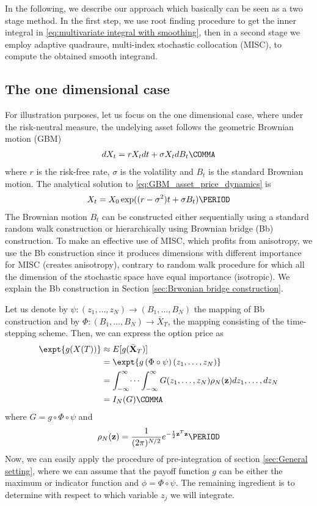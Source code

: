 In the following, we describe our approach which basically can be seen as a two stage method. In the first step, we use root finding procedure to get the inner integral  in \eqref{eq:multivariate integral with smoothing}, then in a second stage we employ adaptive quadraure, multi-index stochastic collocation (MISC), to compute the obtained smooth integrand.

\subsection{The one dimensional case}
For illustration purposes, let us focus on the one dimensional case, where under the risk-neutral measure, the undelying asset follows the geometric Brownian motion (GBM)
\begin{align}\label{eq:GBM_asset_price_dynamics}
dX_t= r X_t dt+\sigma X_t dB_t \COMMA 
\end{align}
		where $r$ is the risk-free rate, $\sigma$ is the volatility and $B_t$ is the standard Brownian motion. The analytical solution to  \eqref{eq:GBM_asset_price_dynamics} is 
\begin{align*}
	X_t=  X_0 \exp(( r-\sigma^2) t+\sigma B_t) \PERIOD
\end{align*}
The Brownian motion $B_t$ can be constructed either sequentially using a standard random walk construction or hierarchically using Brownian bridge (Bb) construction. To make an effective use of MISC, which profits from  anisotropy, we use the Bb construction since it produces  dimensions with different importance for MISC (creates anisotropy), contrary to random walk procedure for which all the dimension of the stochastic space have equal importance (isotropic). We explain the Bb construction in Section \ref{sec:Brwonian bridge construction}.

Let us denote by $\psi: (z_1,\dots,z_N) \rightarrow (B_1,\dots,B_N)$ the mapping of Bb construction and by $\Phi: (B_1,\dots,B_N) \rightarrow \bar{X}_T$, the mapping consisting of the time-stepping scheme. Then, we can express the option price as
\begin{align}\label{eq: option price as integral}
\expt{g(X(T))}&\approx E[g(\bar{\mathbf{X}}_T)] \nonumber\\
&=\expt{g\left(\Phi \circ \psi \right) (z_1,\dots,z_N)} \nonumber\\
&=\int_{-\infty}^{\infty} \dots \int_{-\infty}^{\infty} G(z_1,\dots,z_N)  \rho_N(\mathbf{z}) dz_1,\dots,dz_N \nonumber\\
&= I_N (G) \COMMA
\end{align}
where $G=g \circ \Phi \circ \psi$ and
\begin{equation*}\label{eq: multivariate gaussian distribution}
\rho_N(\mathbf{z})=\frac{1}{(2 \pi)^{N/2}} e^{-\frac{1}{2} \mathbf{z}^T \mathbf{z}} \PERIOD
\end{equation*}
Now, we can easily apply the procedure of pre-integration  of section \ref{sec:General setting}, where we can assume that the payoff function $g$ can be either the  maximum or indicator function and $\phi=\Phi \circ \psi$. The remaining ingredient is to determine with respect to which variable $z_j$ we will integrate.

